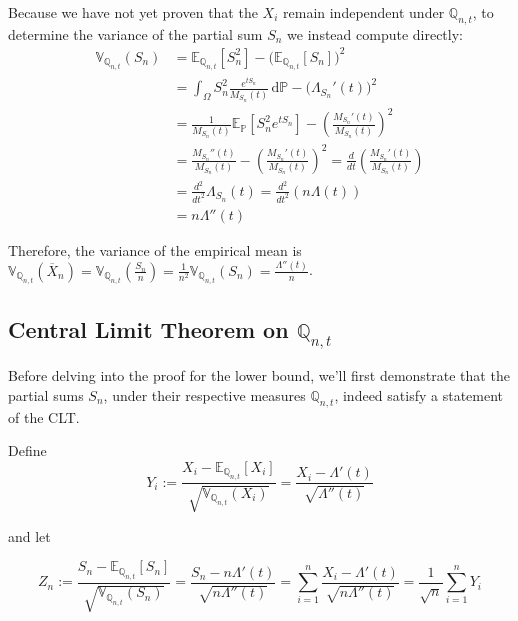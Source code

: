 \documentclass{article}
\newcommand{\E}{\mathbb{E}}
\renewcommand{\P}{\mathbb{P}}
\newcommand{\Q}{\mathbb{Q}}
\newcommand{\Var}{\mathbb{V}}
\begin{document}
Because we have not yet proven that the $X_i$ remain independent under $\Q_{n,t}$, to determine the
variance of the partial sum $S_n$ we instead compute directly:
\begin{equation}
  \begin{aligned}
    \Var_{\Q_{n,t}}(S_n) &= \E_{\Q_{n,t}}[S_n^2] - \big(\E_{\Q_{n,t}}[S_n]\big)^2 \\
    &= \int_\Omega S_n^2 \frac{e^{t S_n}}{M_{S_n}(t)} \, \text{d}\P - \big(\Lambda_{S_n}'(t)\big)^2 \\
    &= \frac{1}{M_{S_n}(t)} \E_\P[S_n^2 e^{t S_n}] - \left( \frac{M_{S_n}'(t)}{M_{S_n}(t)} \right)^2\\
    &= \frac{M_{S_n}''(t)}{M_{S_n}(t)} - \left( \frac{M_{S_n}'(t)}{M_{S_n}(t)} \right)^2
    = \frac{d}{dt} \left( \frac{M_{S_n}'(t)}{M_{S_n}(t)} \right) \\
    &= \frac{d^2}{dt^2}\Lambda_{S_n}(t) = \frac{d^2}{dt^2} \left(n\Lambda(t)\right) \\
    &= n\Lambda''(t)
  \end{aligned}
\end{equation}

Therefore, the variance of the empirical mean is $\Var_{\Q_{n,t}}(\overline{X}_n) = \Var_{\Q_{n,t}}\left(\frac{S_n}{n}\right) = \frac{1}{n^2}\Var_{\Q_{n,t}}(S_n)= \frac{\Lambda''(t)}{n}$.

\subsection{Central Limit Theorem on $\Q_{n,t}$}
\label{subsec:clt-tilted}

Before delving into the proof for the lower bound, we'll first demonstrate that the
partial sums $S_n$, under their respective measures $\Q_{n,t}$, indeed satisfy a statement of the
CLT.

Define
\begin{equation}
  Y_i := \frac{X_i - \E_{\Q_{n,t}}[X_i]}{\sqrt{\Var_{\Q_{n,t}}(X_i)}} = \frac{X_i - \Lambda'(t)}{\sqrt{\Lambda''(t)}}
\end{equation}

and let

\begin{equation}
  Z_n := \frac{S_n - \E_{\Q_{n,t}}[S_n]}{\sqrt{\Var_{\Q_{n,t}}(S_n)}}
  = \frac{S_n - n\Lambda'(t)}{\sqrt{n\Lambda''(t)}} = \sum_{i=1}^n \frac{X_i - \Lambda'(t)}{\sqrt{n\Lambda''(t)}}
  = \frac{1}{\sqrt{n}} \sum_{i=1}^n Y_i
\end{equation}
\end{document}
